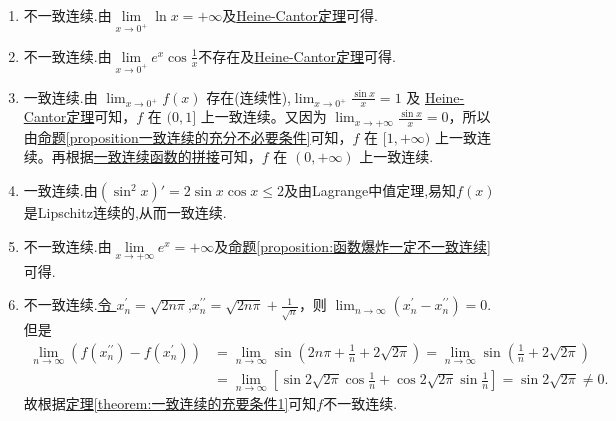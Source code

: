 \documentclass[../../main.tex]{subfiles}%
\begin{document}
\begin{solution}
\begin{enumerate}[(1)]
\item 不一致连续.由$\underset{x\rightarrow 0^+}{\lim}\ln x=+\infty $及\hyperref[theroem:Heine-Cantor定理]{Heine-Cantor定理}可得.

\item 不一致连续.由$\underset{x\rightarrow 0^+}{\lim}e^x\cos \frac{1}{x}$不存在及\hyperref[theroem:Heine-Cantor定理]{Heine-Cantor定理}可得.

\item 一致连续.由 $\lim_{x \rightarrow 0^+} f(x)$ 存在(连续性),$\lim_{x \rightarrow 0^+} \frac{\sin x}{x} = 1$ 及 \hyperref[theroem:Heine-Cantor定理]{Heine-Cantor定理}可知，$f$ 在 $(0, 1]$ 上一致连续。又因为 $\lim_{x \rightarrow +\infty} \frac{\sin x}{x} = 0$，所以由\hyperref[proposition一致连续的充分不必要条件]{命题\ref{proposition一致连续的充分不必要条件}}可知，$f$ 在 $[1, +\infty)$ 上一致连续。再根据\hyperref[proposition:一致连续函数的拼接]{一致连续函数的拼接}可知，$f$ 在 $(0, +\infty)$ 上一致连续.

\item 一致连续.由$(\sin^2 x)'=2\sin x \cos x\leqslant  2$及由Lagrange中值定理,易知$f(x)$是Lipschitz连续的,从而一致连续.

\item 不一致连续.由$\underset{x\rightarrow +\infty}{\lim}e^x=+\infty $及\hyperref[proposition:函数爆炸一定不一致连续]{命题\ref{proposition:函数爆炸一定不一致连续}}可得.

\item\label{example5.5(6)} 不一致连续.\hyperlink{找这两个数列的方法}{令 $x_{n}^{\prime} = \sqrt{2n\pi}$,$x_{n}^{\prime\prime} = \sqrt{2n\pi} + \frac{1}{\sqrt{n}}$}，则
\(
\lim_{n \rightarrow \infty} \left( x_{n}^{\prime} - x_{n}^{\prime\prime} \right) = 0.
\)
但是
\begin{align*}
\lim_{n \rightarrow \infty} \left( f\left( x_{n}^{\prime\prime} \right) - f\left( x_{n}^{\prime} \right) \right) &= \lim_{n \rightarrow \infty} \sin \left( 2n\pi + \frac{1}{n} + 2\sqrt{2\pi} \right) = \lim_{n \rightarrow \infty} \sin \left( \frac{1}{n} + 2\sqrt{2\pi} \right)
\\
&= \lim_{n \rightarrow \infty} \left[ \sin 2\sqrt{2\pi} \cos \frac{1}{n} + \cos 2\sqrt{2\pi} \sin \frac{1}{n} \right] = \sin 2\sqrt{2\pi} \ne 0.
\end{align*}
故根据\hyperref[theorem:一致连续的充要条件1]{定理\ref{theorem:一致连续的充要条件1}}可知$f$不一致连续.


\end{enumerate}
\end{solution}
\end{document}
